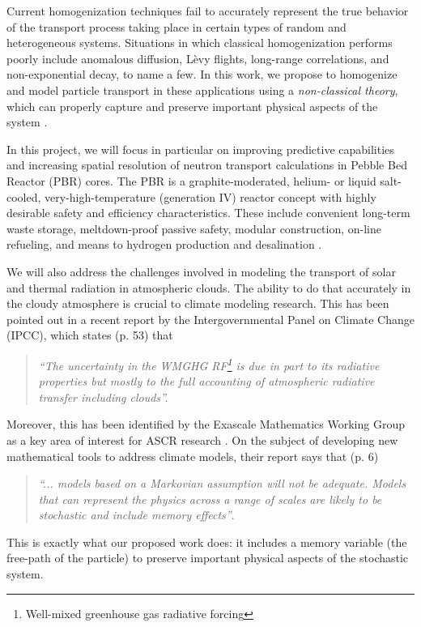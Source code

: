 \documentclass[12pt]{article}
\begin{document}
Current homogenization techniques fail to accurately represent the true behavior of the transport process taking place in certain types of random and heterogeneous systems.
Situations in which classical homogenization performs poorly include anomalous diffusion, L\`evy flights, long-range correlations, and non-exponential decay, to name a few.
In this work, we propose to homogenize and model particle transport in these applications using a \textit{non-classical theory}, which can properly capture and preserve important physical aspects of the system \cite{larvas11,davxu14,xudav16,vaslar14b,vas13}.

In this project, we will focus in particular on improving predictive capabilities and increasing spatial resolution of neutron transport calculations in Pebble Bed Reactor (PBR) cores.
The PBR is a graphite-moderated, helium- or liquid salt-cooled, very-high-temperature (generation IV) reactor concept with highly desirable safety and efficiency characteristics.
These include convenient long-term waste storage, meltdown-proof passive safety, modular construction, on-line refueling, and means to hydrogen production and desalination \cite{htrpm,pbmr,mpbr}.

We will also address the challenges involved in modeling the transport of solar and thermal radiation in atmospheric clouds.
The ability to do that accurately in the cloudy atmosphere is crucial to climate modeling research.
This has been pointed out in a recent report\cite{ipcc13} by the Intergovernmental Panel on Climate Change (IPCC), which states (p. 53) that
\begin{quote}
\textit{``The uncertainty in the WMGHG RF\footnote{Well-mixed greenhouse gas radiative forcing} is due in part to its radiative properties but mostly to the full accounting of atmospheric radiative transfer including clouds''.}
\end{quote}

Moreover, this has been identified by the Exascale Mathematics Working Group as a key area of interest for ASCR research \cite{amrec14}.
On the subject of developing new mathematical tools to address climate models, their report says that (p. 6)
\begin{quote}
\textit{``... models based on a Markovian assumption will not be adequate.
Models that can represent the physics across a range of scales are likely to be stochastic and include memory effects''}.
\end{quote}
This is exactly what our proposed work does: it includes a memory variable (the free-path of the particle) to preserve important physical aspects of the stochastic system.
\end{document}
